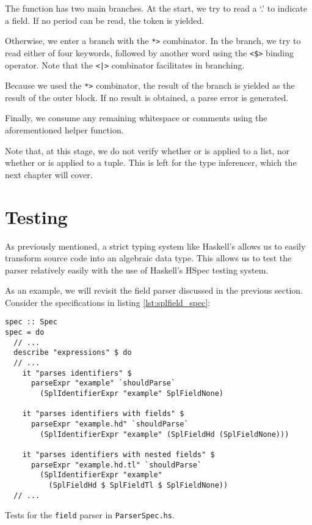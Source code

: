The  function has two main branches.
At the start, we try to read a `.' to indicate a field.
If no period can be read, the  token is yielded.

Otherwise, we enter a branch with the \texttt{*>} combinator.
In the branch, we try to read either of four keywords, followed by another word using the \texttt{<\$>} binding operator.
Note that the \texttt{<|>} combinator facilitates in branching.

Because we used the \texttt{*>} combinator, the result of the branch is yielded as the result of the outer block. If no result is obtained, a parse error is generated.

Finally, we consume any remaining whitespace or comments using the aforementioned  helper function.

Note that, at this stage, we do not verify whether  or  is applied to a list, nor whether  or  is applied to a tuple.
This is left for the type inferencer, which the next chapter will cover.

\section{Testing}

As previously mentioned, a strict typing system like Haskell's allows us to easily transform source code into an algebraic data type.
This allows us to test the parser relatively easily with the use of Haskell's HSpec testing system.

As an example, we will revisit the field parser discussed in the previous section. Consider the specifications in listing \ref{lst:splfield_spec}:

\begin{listing}
\begin{verbatim}
spec :: Spec
spec = do
  // ...
  describe "expressions" $ do
  // ...
    it "parses identifiers" $
      parseExpr "example" `shouldParse`
        (SplIdentifierExpr "example" SplFieldNone)

    it "parses identifiers with fields" $
      parseExpr "example.hd" `shouldParse`
        (SplIdentifierExpr "example" (SplFieldHd (SplFieldNone)))

    it "parses identifiers with nested fields" $
      parseExpr "example.hd.tl" `shouldParse`
        (SplIdentifierExpr "example"
          (SplFieldHd $ SplFieldTl $ SplFieldNone))
  // ...
\end{verbatim}
\caption{Tests for the \texttt{field} parser in \texttt{ParserSpec.hs}.}
\label{lst:splfield_spec}
\end{listing}

